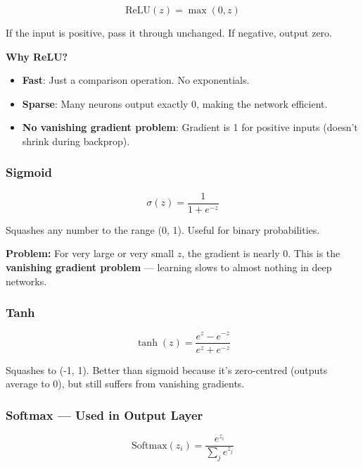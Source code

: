 \documentclass[12pt, a4paper]{article}
\begin{document}
\begin{equation}
  \text{ReLU}(z) = \max(0, z)
\end{equation}

If the input is positive, pass it through unchanged. If negative, output zero.

\textbf{Why ReLU?}
\begin{itemize}
  \item \textbf{Fast}: Just a comparison operation. No exponentials.
  \item \textbf{Sparse}: Many neurons output exactly 0, making the network efficient.
  \item \textbf{No vanishing gradient problem}: Gradient is 1 for positive inputs (doesn't shrink during backprop).
\end{itemize}

\subsubsection{Sigmoid}

\begin{equation}
  \sigma(z) = \frac{1}{1 + e^{-z}}
\end{equation}

Squashes any number to the range (0, 1). Useful for binary probabilities.

\textbf{Problem:} For very large or very small $z$, the gradient is nearly 0. This is the \textbf{vanishing gradient problem} --- learning slows to almost nothing in deep networks.

\subsubsection{Tanh}

\begin{equation}
  \tanh(z) = \frac{e^z - e^{-z}}{e^z + e^{-z}}
\end{equation}

Squashes to (-1, 1). Better than sigmoid because it's zero-centred (outputs average to 0), but still suffers from vanishing gradients.

\subsubsection{Softmax --- Used in Output Layer}

\begin{equation}
  \text{Softmax}(z_i) = \frac{e^{z_i}}{\sum_j e^{z_j}}
\end{equation}
\end{document}
